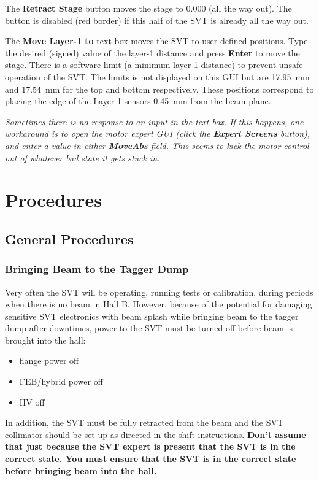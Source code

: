 \documentclass[12pt]{report}
\begin{document}
The \textbf{Retract Stage} button moves the stage to 0.000 (all the way out).
The button is disabled (red border) if this half of the SVT is already all the way out.

The \textbf{Move Layer-1 to} text box moves the SVT to user-defined positions.
Type the desired (signed) value of the layer-1 distance and press \textbf{Enter} to move the stage.
There is a software limit (a minimum layer-1 distance) to prevent unsafe operation of the SVT. The limits is not displayed on this GUI but are 17.95~mm and 17.54~mm for the top and bottom respectively.  These positions correspond to placing the edge of the Layer 1 sensors 0.45~mm from the beam plane.

\emph{Sometimes there is no response to an input in the text box. If this happens, one workaround is to open the motor expert GUI (click the \textbf{Expert Screens} button), and enter a value in either \textbf{MoveAbs} field. This seems to kick the motor control out of whatever bad state it gets stuck in.}





\chapter{Procedures}


\section{General Procedures}
\label{sec:proc_general_beamchecklist}

\subsection{Bringing Beam to the Tagger Dump}
Very often the SVT will be operating, running tests or calibration, during periods when there is no beam in Hall B. However, because of the potential for damaging sensitive SVT electronics with beam splash while bringing beam to the tagger dump after downtimes, power to the SVT must be turned off before beam is brought into the hall:  
\begin{itemize}
\item flange power off
\item FEB/hybrid power off
\item HV off
\end {itemize}
In addition, the SVT must be fully retracted from the beam and the SVT collimator should be set up as directed in the shift instructions.  \textbf{Don't assume that just because the SVT expert is present that the SVT is in the correct state. You must ensure that the SVT is in the correct state before bringing beam into the hall.}
\end{document}
